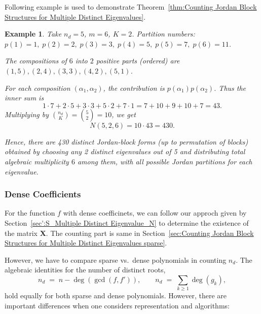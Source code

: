 \documentclass[11pt]{article}
\newtheorem{example}{Example}
\begin{document}
Following example is used to demonstrate Theorem~\ref{thm:Counting Jordan Block Structures for Multiple Distinct Eigenvalues}.

\begin{example}
Take \(n_d=5\), \(m=6\), \(K=2\).  
Partition numbers: \(p(1)=1,\;p(2)=2,\;p(3)=3,\;p(4)=5,\;p(5)=7,\;p(6)=11\).

The compositions of \(6\) into \(2\) positive parts (ordered) are
\((1,5),(2,4),(3,3),(4,2),(5,1)\).

For each composition \((\alpha_1,\alpha_2)\), the contribution is \(p(\alpha_1)p(\alpha_2)\).  
Thus the inner sum is
\[
1\cdot 7 + 2\cdot 5 + 3\cdot 3 + 5\cdot 2 + 7\cdot 1
=7+10+9+10+7=43.
\]
Multiplying by \(\binom{n_d}{K}=\binom{5}{2}=10\), we get
\[
N(5,2,6)=10\cdot 43=430.
\]

Hence, there are 430 distinct Jordan-block forms (up to permutation of blocks) obtained by choosing any 2 distinct eigenvalues out of 5 and distributing total algebraic multiplicity \(6\) among them, with all possible Jordan partitions for each eigenvalue.
\end{example}


\subsubsection{Dense Coefficients}\label{sec':D_Multiple Distinct Eigenvalue_N}

For the function $f$ with dense coefficinets, we can follow our approch given by Section~\ref{sec':S_Multiple Distinct Eigenvalue_N} to determine the existence of the matrix $\bm{X}$. The counting part is same in Section~\ref{sec:Counting Jordan Block Structures for Multiple Distinct Eigenvalues sparse}.




However, we have to compare sparse vs.\ dense polynomials in counting $n_d$. The algebraic identities for the number of distinct roots,
\[
n_d \;=\; n - \deg(\gcd(f,f')), 
\qquad
n_d \;=\; \sum_{k\ge1}\deg(g_k),
\]
hold equally for both sparse and dense polynomials.  
However, there are important differences when one considers representation and algorithms:
\end{document}
